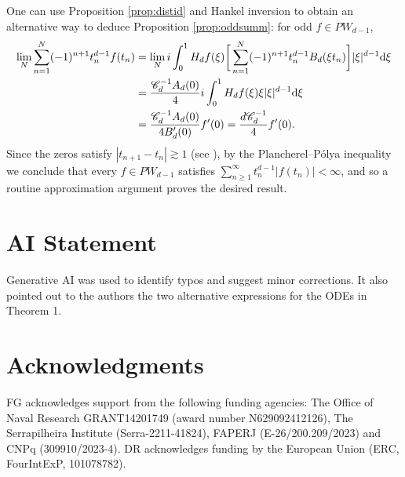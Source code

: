\documentclass[a4paper,reqno,12pt]{amsart}
\newcommand{\C}{\mathscr{C}}
\renewcommand{\d}{{\rm d}}
\begin{document}
One can use Proposition \ref{prop:distid} and Hankel inversion to obtain an alternative way to deduce Proposition \ref{prop:oddsumm}: for odd $f\in PW_{d-1}$,
\begin{align*}
\lim_N \sum_{n=1}^N (-1)^{n+1}t_n^{d-1} f(t_n) & = \lim_N i \int_{0}^1 H_d f(\xi) \bigg[ \sum_{n=1}^N(-1)^{n+1}t_n^{d-1}B_d(\xi t_n)\bigg] |\xi|^{d-1}\d \xi  \\
& =\frac{\C_d^{-1}A_d(0)}{4 }  i \int_{0}^1 H_d f(\xi) \xi |\xi|^{d-1}\d \xi \\
& = \frac{\C_d^{-1}A_d(0)}{4B'_d(0) }  f'(0) = \frac{d\C_d^{-1}}{4} f'(0).
\end{align*}
Since the zeros satisfy $|t_{n+1} - t_n| \gtrsim 1$ (see \cite[Theorem 1.7]{B}), by the Plancherel--Pólya inequality \cite{PP1,PP2} we conclude that every $f\in PW_{d-1}$ satisfies  $\sum_{n\geq 1}^\infty t_n^{d-1}| f(t_n)|  <\infty$, and so a routine approximation argument proves the desired result. 

\vspace{-0.2cm}
\section*{AI Statement}
Generative AI was used to identify typos and suggest minor corrections. It also pointed out to the authors the two alternative expressions for the ODEs in Theorem 1.



\section*{Acknowledgments}
FG acknowledges support from the following funding agencies: The Office of Naval Research GRANT14201749 (award number N629092412126), The Serrapilheira Institute (Serra-2211-41824), FAPERJ (E-26/200.209/2023) and CNPq (309910/2023-4). DR acknowledges funding by the European Union (ERC, FourIntExP, 101078782). 
\end{document}
